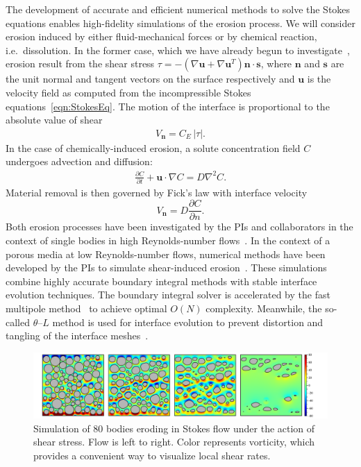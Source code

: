 \documentclass[11pt]{article}
\newcommand{\pd}[2]{ \frac{ \partial #1}{ \partial #2 } }
\newcommand{\bvec}[1]{{\mathbf{#1}}}
\newcommand{\grad}{\nabla}
\newcommand {\Lap} {\grad^2}
\newcommand{\abs}[1]{\left| #1 \right|}
\newcommand{\uu}{\bvec{u}}
\newcommand{\nn}{{\mathbf{n}}}
\renewcommand{\ss}{{\mathbf{s}}}
\newcommand{\Vn}{V_\nn}
\newcommand{\CE}{C_E}
\newcommand {\ny}{n}
\newcommand{\Diff}{D}
\newcommand{\thL}{$\theta$--$L$}
\begin{document}
The development of accurate and efficient numerical methods to solve the Stokes equations enables high-fidelity simulations of the erosion process. We will consider erosion induced by either fluid-mechanical forces or by chemical reaction, i.e.~dissolution. In the former case, which we have already begun to investigate~\cite{Quaife2018}, erosion result from the shear stress $\tau = -\left(\nabla \uu + \nabla \uu^T \right)\nn \cdot \ss$, where $\nn$ and $\ss$ are the unit normal and tangent vectors on the surface respectively and $\uu$ is the velocity field as computed from the incompressible Stokes equations~\eqref{eqn:StokesEq}. The motion of the interface is proportional to the absolute value of shear 
\begin{align}
  \Vn = \CE \, \abs{\tau}.
\end{align}
In the case of chemically-induced erosion, a solute concentration field $C$ undergoes advection and diffusion:
\begin{align}
  \label{Ceq}
  \pd{C}{t} + \uu \cdot \grad C = \Diff \Lap C.
\end{align}
Material removal is then governed by Fick's law with interface velocity
\begin{equation}
\label{DissVn}
\Vn = \Diff \pd{C}{\ny}.
\end{equation}
Both erosion processes have been investigated by the PIs and collaborators in the context of single bodies in high Reynolds-number flows~\cite{Ristroph2012, MoorePOF2013, HuangJFM2015, MooreCPAM2017}. In the context of a porous media at low Reynolds-number flows, numerical methods have been developed by the PIs to simulate shear-induced erosion~\cite{Quaife2018, chi-moo-qua2019}. These simulations combine highly accurate boundary integral methods with stable interface evolution techniques.  The boundary integral solver is accelerated by the fast multipole method~\cite{gre-rok1987, gre-gre-may1992} to achieve optimal $O(N)$ complexity. Meanwhile, the so-called {\thL} method is used for interface evolution to prevent distortion and tangling of the interface meshes~\cite{hou1994removing, MoorePOF2013, Quaife2018}.

\begin{figure}[htp]
\begin{center}
\includegraphics[width = 0.99 \textwidth]{./figs/80circ8vort.pdf}
\caption{\label{80circ8vort} Simulation of 80 bodies eroding in Stokes flow under the action of shear stress. Flow is left to right. Color represents vorticity, which provides a convenient way to visualize local shear rates. 
}
\end{center}
\end{figure}
 
\end{document}
